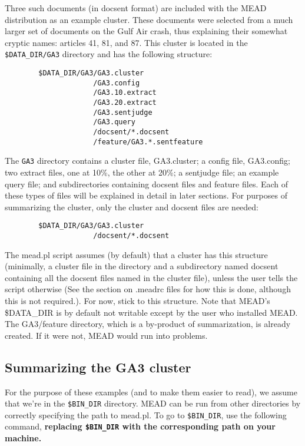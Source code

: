 \documentclass[10pt]{article}
\begin{document}
Three such documents (in docsent format) are included with the MEAD distribution as
an example cluster.  These documents were selected from a much
larger set of documents on the Gulf Air crash, thus explaining
their somewhat cryptic names: articles 41, 81, and 87.
This cluster is located in the \verb|$DATA_DIR/GA3| directory and has the following 
structure:

\begin{verbatim}
        $DATA_DIR/GA3/GA3.cluster
                     /GA3.config
                     /GA3.10.extract
                     /GA3.20.extract
                     /GA3.sentjudge
                     /GA3.query
                     /docsent/*.docsent
                     /feature/GA3.*.sentfeature
\end{verbatim}

The \verb|GA3| directory contains a cluster file, GA3.cluster; a
config file, GA3.config; two extract files, one at 10\%, the
other at 20\%; a sentjudge file; an example query file; and
subdirectories containing docsent files and feature files.  Each
of these types of files will be explained in detail in later sections.
For purposes of summarizing the cluster, only the cluster and
docsent files are needed:

\begin{verbatim}
        $DATA_DIR/GA3/GA3.cluster
                     /docsent/*.docsent
\end{verbatim}

The mead.pl script assumes (by default) that a cluster has this
structure (minimally, a cluster file in the directory and a
subdirectory named docsent containing all the docsent files named
in the cluster file), unless the user tells the script otherwise (See the section
on .meadrc files for how this is done, although this is not required.).
For now, stick to this structure.  Note that MEAD's \$DATA\_DIR is 
by default not writable except by the user who installed MEAD.  The 
GA3/feature directory, which is a by-product of summarization, is
already created.  If it were not, MEAD would run into problems.

\subsection{Summarizing the GA3 cluster}

For the purpose of these examples (and to make them easier to read),
we assume that we're in the \verb|$BIN_DIR| directory.  MEAD can be run from 
other directories by correctly specifying the path to mead.pl.
To go to \verb|$BIN_DIR|, use the following command, 
{\bf replacing \verb|$BIN_DIR| with the corresponding path on your machine.}\\
\end{document}
